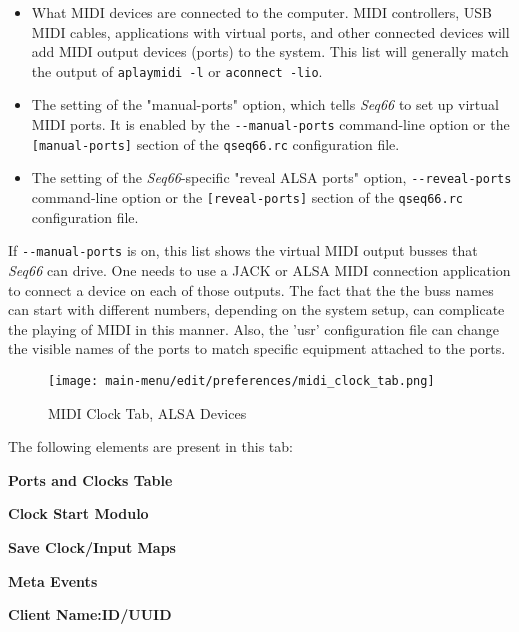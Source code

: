    \begin{itemize}
      \item What MIDI devices are connected to the computer.
         MIDI controllers, USB MIDI cables, applications with virtual
         ports, and other connected devices will add MIDI
         output devices (ports) to the system.
         This list will generally match the output of \texttt{aplaymidi -l}
         or \texttt{aconnect -lio}.
      \item The setting of the "manual-ports" option, which tells
         \textsl{Seq66} to set up virtual MIDI ports.
         It is enabled by the
         \texttt{-{}-manual-ports} command-line option or the
         \texttt{[manual-ports]} section of the
         \texttt{qseq66.rc} configuration file.
      \item The setting of the \textsl{Seq66}-specific
         "reveal ALSA ports" option,
         \texttt{-{}-reveal-ports} command-line option or the
         \texttt{[reveal-ports]} section of the
         \texttt{qseq66.rc} configuration file.
   \end{itemize}

   If \texttt{-{}-manual-ports} is on, this list shows the virtual
   MIDI output busses that \textsl{Seq66} can drive.
   One needs to use a JACK or ALSA MIDI
   connection application to connect a device on each of those outputs.
   The fact that the the buss names can
   start with different numbers, depending on the system setup, can complicate
   the playing of MIDI in this manner.  Also, the 'usr' configuration file can
   change the visible names of the ports to match specific equipment attached
   to the ports.

\begin{figure}[H]
   \centering 
   \texttt{[image: main-menu/edit/preferences/midi\_clock\_tab.png]}
   \caption{MIDI Clock Tab, ALSA Devices}
   \label{fig:midi_clock_tab}
\end{figure}

   The following elements are present in this tab:

   \begin{enumber}
      \item \textbf{Ports and Clocks Table}
      \item \textbf{Clock Start Modulo}
      \item \textbf{Save Clock/Input Maps}
      \item \textbf{Meta Events}
      \item \textbf{Client Name:ID/UUID}
   \end{enumber}

